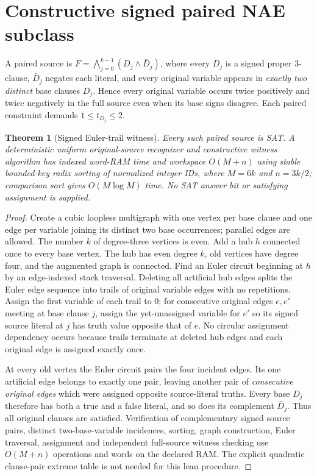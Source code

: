 \documentclass[10pt]{article}
\newtheorem{theorem}{Theorem}
\begin{document}
\section{Constructive signed paired NAE subclass}
A paired source is $F=\bigwedge_{j=0}^{k-1}(D_j\land\bar D_j)$, where every $D_j$ is a signed proper 3-clause, $\bar D_j$ negates each literal, and every original variable appears in \emph{exactly two distinct} base clauses $D_j$. Hence every original variable occurs twice positively and twice negatively in the full source even when its base signs disagree. Each paired constraint demands $1\le t_{D_j}\le2$.
\begin{theorem}[Signed Euler-trail witness]
Every such paired source is SAT. A deterministic uniform original-source recognizer and constructive witness algorithm has indexed word-RAM time and workspace $O(M+n)$ using stable bounded-key radix sorting of normalized integer IDs, where $M=6k$ and $n=3k/2$; comparison sort gives $O(M\log M)$ time. No SAT answer bit or satisfying assignment is supplied.
\end{theorem}
\begin{proof}
Create a cubic loopless multigraph with one vertex per base clause and one edge per variable joining its distinct two base occurrences; parallel edges are allowed. The number $k$ of degree-three vertices is even. Add a hub $h$ connected once to every base vertex. The hub has even degree $k$, old vertices have degree four, and the augmented graph is connected. Find an Euler circuit beginning at $h$ by an edge-indexed stack traversal. Deleting all artificial hub edges splits the Euler edge sequence into trails of original variable edges with no repetitions. Assign the first variable of each trail to 0; for consecutive original edges $e,e'$ meeting at base clause $j$, assign the yet-unassigned variable for $e'$ so its signed source literal at $j$ has truth value opposite that of $e$. No circular assignment dependency occurs because trails terminate at deleted hub edges and each original edge is assigned exactly once.

At every old vertex the Euler circuit pairs the four incident edges. Its one artificial edge belongs to exactly one pair, leaving another pair of \emph{consecutive original edges} which were assigned opposite source-literal truths. Every base $D_j$ therefore has both a true and a false literal, and so does its complement $\bar D_j$. Thus all original clauses are satisfied. Verification of complementary signed source pairs, distinct two-base-variable incidences, sorting, graph construction, Euler traversal, assignment and independent full-source witness checking use $O(M+n)$ operations and words on the declared RAM. The explicit quadratic clause-pair extreme table is not needed for this lean procedure.
\end{proof}
\end{document}
